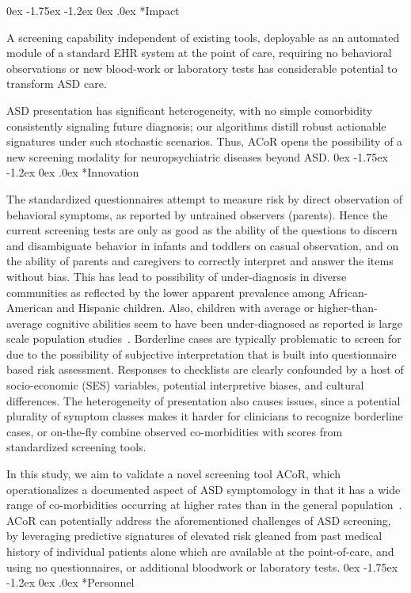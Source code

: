 \documentclass[onecolumn, compsoc,11pt]{IEEEtran}
\makeatletter
\renewcommand\subsection{\@startsection {subsection}{2}{\z@}%
                                   {0ex \@plus -1.75ex \@minus -1.2ex}%
                                   {0ex \@plus.0ex}%
                                   {\fontsize{11}{11}\selectfont\bfseries\sffamily\color{black}}}
\def\acor{ACoR\xspace}
\makeatother
\begin{document}
\subsection*{Impact}

A  screening capability  independent of existing tools, deployable as an automated module  of a standard EHR system at the point of care, requiring no behavioral observations or  new blood-work or laboratory tests has considerable  potential to transform ASD care. 

ASD presentation has significant heterogeneity, with no simple comorbidity  consistently signaling future  diagnosis; our algorithms distill robust actionable signatures under such stochastic scenarios. Thus,  \acor opens the possibility of a new screening modality for  neuropsychiatric diseases beyond ASD.
\subsection*{Innovation}


The standardized questionnaires attempt to measure risk by direct observation of behavioral symptoms, as reported by untrained observers (parents). Hence the current screening  tests are only as good as the ability of the questions to discern and disambiguate behavior in infants and toddlers on casual observation, and on the ability of parents and caregivers to correctly interpret and answer the items without bias.
This has lead to possibility of  under-diagnosis in diverse communities as reflected by the
lower apparent prevalence among African-American and Hispanic children. Also, children with average or higher-than-average cognitive abilities seem to have been under-diagnosed as reported is large scale population studies~\cite{hyman2020identification}. Borderline cases are typically problematic to screen for due to the possibility  of subjective interpretation that is built into questionnaire based risk assessment. Responses to checklists are clearly confounded by a host of socio-economic (SES) variables, potential interpretive biases, and  cultural differences. The heterogeneity of presentation also causes issues, since a potential plurality of symptom classes makes it harder for clinicians  to recognize borderline cases, or on-the-fly combine observed co-morbidities with scores from  standardized screening tools. 

In this study, we aim to validate a novel screening tool \acor, which operationalizes a documented aspect of ASD symptomology in  that it has   a wide range  of co-morbidities occurring at  higher rates than in the general population~\cite{hyman2020identification}.
\acor  can potentially address the aforementioned   challenges of ASD screening, by leveraging predictive signatures of  elevated risk gleaned from past medical history of individual  patients alone which are available at the point-of-care, and using no questionnaires, or additional bloodwork or laboratory tests.
\subsection*{Personnel}


{\fontsize{9}{10}\selectfont


}
\end{document}
